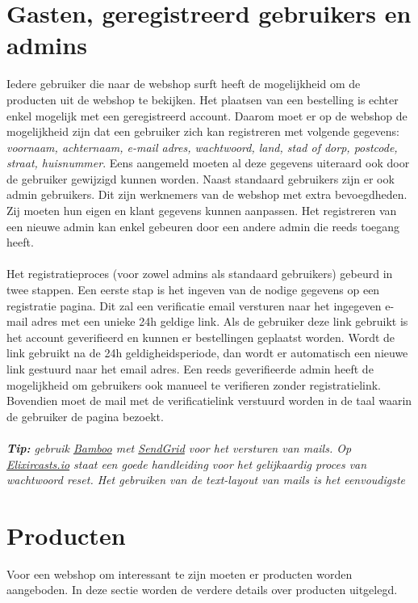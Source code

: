 \documentclass{article}
\begin{document}
\section{Gasten, geregistreerd gebruikers en admins}
Iedere gebruiker die naar de webshop surft heeft de mogelijkheid om de producten uit de webshop te bekijken. Het plaatsen van een bestelling is echter enkel mogelijk met een geregistreerd account. Daarom moet er op de webshop de mogelijkheid zijn dat een gebruiker zich kan registreren met volgende gegevens: \textit{voornaam, achternaam, e-mail adres, wachtwoord, land, stad of dorp, postcode, straat, huisnummer}. Eens aangemeld moeten al deze gegevens uiteraard ook door de gebruiker gewijzigd kunnen worden. Naast standaard gebruikers zijn er ook admin gebruikers. Dit zijn werknemers van de webshop met extra bevoegdheden. Zij moeten hun eigen en klant gegevens kunnen aanpassen. Het registreren van een nieuwe admin kan enkel gebeuren door een andere admin die reeds toegang heeft. 
\\ 
\\
Het registratieproces (voor zowel admins als standaard gebruikers) gebeurd in twee stappen. Een eerste stap is het ingeven van de nodige gegevens op een registratie pagina. Dit zal een verificatie email versturen naar het ingegeven e-mail adres met een unieke 24h geldige link. Als de gebruiker deze link gebruikt is het account geverifieerd en kunnen er bestellingen geplaatst worden. Wordt de link gebruikt na de 24h geldigheidsperiode, dan wordt er automatisch een nieuwe link gestuurd naar het email adres. Een reeds geverifieerde admin heeft de mogelijkheid om gebruikers ook manueel te verifieren zonder registratielink. Bovendien moet de mail met de verificatielink verstuurd worden in de taal waarin de gebruiker de pagina bezoekt. 
\\
\\
\textit{\textbf{Tip:} gebruik \href{https://hexdocs.pm/bamboo/1.1.0/readme.html}{Bamboo}  met \href{https://sendgrid.com}{SendGrid} voor het versturen van mails. Op \href{https://elixircasts.io/password-reset}{Elixircasts.io} staat een goede handleiding voor het gelijkaardig proces van wachtwoord reset. Het gebruiken van de text-layout van mails is het eenvoudigste}

\section{Producten}
Voor een webshop om interessant te zijn moeten er producten worden aangeboden. In deze sectie worden de verdere details over producten uitgelegd.
\end{document}
